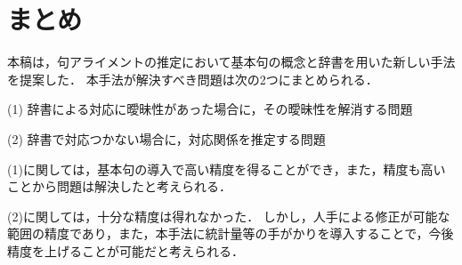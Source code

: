 \section{まとめ}

本稿は，句アライメントの推定において基本句の概念と辞書を用いた新しい手法を提案した．
本手法が解決すべき問題は次の2つにまとめられる．

(1) 辞書による対応に曖昧性があった場合に，その曖昧性を解消する問題

(2) 辞書で対応つかない場合に，対応関係を推定する問題


(1)に関しては，基本句の導入で高い精度を得ることができ，また，精度も高いことから問題は解決したと考えられる．

(2)に関しては，十分な精度は得れなかった．
しかし，人手による修正が可能な範囲の精度であり，また，本手法に統計量等の手がかりを導入することで，今後精度を上げることが可能だと考えられる．


